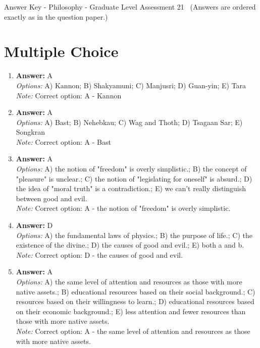 \documentclass[12pt]{article}
\begin{document}
\begin{center}
Answer Key - Philosophy - Graduate Level Assessment 21 \
\small (Answers are ordered exactly as in the question paper.)
\end{center}

\section*{Multiple Choice}
\begin{enumerate}[label=\arabic*.]
\item \textbf{Answer:} A
\\ \textit{Options:} A) Kannon; B) Shakyamuni; C) Manjusri; D) Guan-yin; E) Tara
\\ \textit{Note:} Correct option: A - Kannon
\item \textbf{Answer:} A
\\ \textit{Options:} A) Bast; B) Nehebkau; C) Wag and Thoth; D) Tsagaan Sar; E) Songkran
\\ \textit{Note:} Correct option: A - Bast
\item \textbf{Answer:} A
\\ \textit{Options:} A) the notion of "freedom" is overly simplistic.; B) the concept of "pleasure" is unclear.; C) the notion of "legislating for oneself" is absurd.; D) the idea of "moral truth" is a contradiction.; E) we can't really distinguish between good and evil.
\\ \textit{Note:} Correct option: A - the notion of "freedom" is overly simplistic.
\item \textbf{Answer:} D
\\ \textit{Options:} A) the fundamental laws of physics.; B) the purpose of life.; C) the existence of the divine.; D) the causes of good and evil.; E) both a and b.
\\ \textit{Note:} Correct option: D - the causes of good and evil.
\item \textbf{Answer:} A
\\ \textit{Options:} A) the same level of attention and resources as those with more native assets.; B) educational resources based on their social background.; C) resources based on their willingness to learn.; D) educational resources based on their economic background.; E) less attention and fewer resources than those with more native assets.
\\ \textit{Note:} Correct option: A - the same level of attention and resources as those with more native assets.
\end{enumerate}
\end{document}
